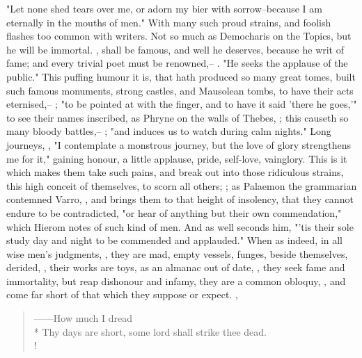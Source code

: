 "Let none shed tears over me, or adorn my bier with sorrow--because I am
eternally in the mouths of men." With many such proud strains, and foolish
flashes too common with writers. Not so much as Democharis on the
Topics, but he will be immortal. ,
shall be famous, and well he deserves, because he writ of fame; and every
trivial poet must be renowned,-- . "He
seeks the applause of the public." This puffing humour it is, that hath
produced so many great tomes, built such famous monuments, strong castles, and
Mausolean tombs, to have their acts eternised,-- ; "to be pointed at with the finger, and to have it said 'there
he goes,'" to see their names inscribed, as Phryne on the walls of Thebes,
; this causeth so many bloody battles,-- ; "and induces us to watch during calm nights." Long journeys,
, "I contemplate a monstrous
journey, but the love of glory strengthens me for it," gaining honour, a little
applause, pride, self-love, vainglory. This is it which makes them take such
pains, and break out into those ridiculous strains, this high conceit of
themselves, to scorn all others; ; as Palaemon the grammarian
contemned Varro, , and brings
them to that height of insolency, that they cannot endure to be contradicted,
"or hear of anything but their own commendation," which
Hierom notes of such kind of men. And as \Austin{} well
seconds him, "'tis their sole study day and night to be commended and
applauded." When as indeed, in all wise men's judgments, ,
they are mad, empty vessels, funges, beside themselves,
derided, , their works are toys, as an almanac out of
date, , they seek
fame and immortality, but reap dishonour and infamy, they are a common obloquy,
, and come far short of that which they suppose or expect.
,

\begin{verse}%
------How much I dread\\*
Thy days are short, some lord shall strike thee dead.\\!
\end{verse}%

